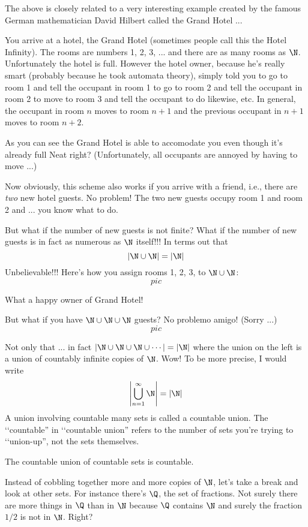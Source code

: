 The above is closely related to a very interesting example created
by the famous German
mathematician David Hilbert called the Grand Hotel ...

You arrive at a hotel, the Grand Hotel (sometimes people call this
the Hotel Infinity).
The rooms are numbers 1, 2, 3, ... and there are as many rooms
as $\N$.
Unfortunately the hotel is full.
However the hotel owner, because he's really smart (probably
because he took automata theory),
simply told you to go to room 1 and tell the occupant in room 1
to go to room 2 and tell the occupant in room 2 to move to room 3 and
tell the occupant to do likewise, etc.
In general, the occupant in room $n$ moves to room $n + 1$
and the previous occupant in $n + 1$ moves to room $n + 2$.

As you can see the Grand Hotel is able to accomodate you even though 
it's already full 
Neat right?
(Unfortunately, all occupants are annoyed by having to move ...)

Now obviously, this scheme also works if you arrive with
a friend, i.e., there are \textit{two} new hotel guests.
No problem!
The two new guests occupy room 1 and room 2 and ... you know what to do.

But what if the number of new guests is not finite?
What if the number of new guests is in fact as numerous as $\N$ itself!!!
In terms out that 
\[
|\N \cup \N| = |\N|
\] 
Unbelievable!!!
Here's how you assign rooms 1, 2, 3, to $\N \cup \N$:
\[
pic
\]

What a happy owner of Grand Hotel!

But what if you have $\N \cup \N \cup \N$ guests?
No problemo amigo! (Sorry ...)
\[
pic
\]

Not only that ... in fact $| \N \cup \N \cup \N \cup \cdots | = |\N|$
where the union on the left is a union of countably infinite copies of 
$\N$. Wow!
To be more precise, I would write
\[
\left|
\bigcup_{n=1}^\infty \N
\right|
=
|\N|
\]
A union involving countable many sets is called a countable union.
The \lq\lq countable'' in \lq\lq countable union'' refers to the
number of sets you're trying to \lq\lq union-up'', not the sets themselves.
 
\begin{thm}
The countable union of countable sets is countable.
\end{thm}

Instead of cobbling together more and more copies of $\N$, 
let's take a break and look at other sets.
For instance there's $\Q$, the set of fractions.
Not surely there are more things in $\Q$ than in $\N$ because
$\Q$ contains $\N$ and surely the fraction $1/2$ is not in $\N$.
Right?

